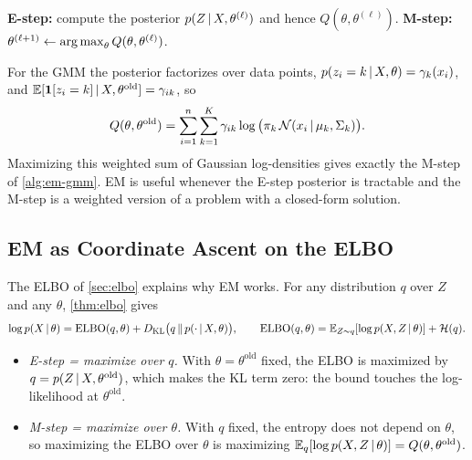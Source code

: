 \begin{algorithm}[H]
\caption{Expectation Maximization (EM)}\label{alg:em}
\begin{algorithmic}[1]
  \State \textbf{E-step:} compute the posterior $p(Z\,|\, X,\theta^{(\ell)})$ and hence $Q(\theta,\theta^{(\ell)})$.
  \State \textbf{M-step:} $\theta^{(\ell+1)}\gets\operatorname*{arg\,max}_\theta Q(\theta,\theta^{(\ell)})$.
\EndFor
{}
\end{algorithmic}
\end{algorithm}

For the GMM the posterior factorizes over data points, $p(z_i=k\,|\, X,\theta)=\gamma_k(x_i)$, and $\mathbb{E}[\mathbf{1}[z_i=k]\,|\, X,\theta^{\mathrm{old}}]=\gamma_{ik}$, so
\[
Q(\theta,\theta^{\mathrm{old}})=\sum_{i=1}^n\sum_{k=1}^K\gamma_{ik}\log\big(\pi_k\,\mathcal{N}(x_i\,|\,\mu_k,\Sigma_k)\big).
\]
Maximizing this weighted sum of Gaussian log-densities gives exactly the M-step of \cref{alg:em-gmm}. EM is useful whenever the E-step posterior is tractable and the M-step is a weighted version of a problem with a closed-form solution.

\subsection*{EM as Coordinate Ascent on the ELBO}

The ELBO of \cref{sec:elbo} explains why EM works. For any distribution $q$ over $Z$ and any $\theta$, \cref{thm:elbo} gives
\begin{equation}\label{eq:em-elbo}
\log p(X\,|\,\theta)=\operatorname{ELBO}(q,\theta)+D_{\mathrm{KL}}\big(q\,\|\,p(\cdot\,|\, X,\theta)\big),\qquad
\operatorname{ELBO}(q,\theta)=\mathbb{E}_{Z\sim q}[\log p(X,Z\,|\,\theta)]+\mathcal{H}(q).
\end{equation}
\begin{itemize}
  \item \emph{E-step = maximize over $q$.} With $\theta=\theta^{\mathrm{old}}$ fixed, the ELBO is maximized by $q=p(Z\,|\, X,\theta^{\mathrm{old}})$, which makes the KL term zero: the bound touches the log-likelihood at $\theta^{\mathrm{old}}$.
  \item \emph{M-step = maximize over $\theta$.} With $q$ fixed, the entropy does not depend on $\theta$, so maximizing the ELBO over $\theta$ is maximizing $\mathbb{E}_q[\log p(X,Z\,|\,\theta)]=Q(\theta,\theta^{\mathrm{old}})$.
\end{itemize}

